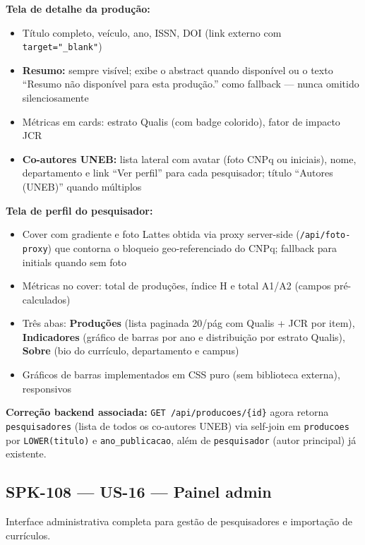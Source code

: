\documentclass[12pt,a4paper]{article}
\begin{document}
\textbf{Tela de detalhe da produção:}
\begin{itemize}[noitemsep]
  \item Título completo, veículo, ano, ISSN, DOI (link externo com \texttt{target="\_blank"})
  \item \textbf{Resumo:} sempre visível; exibe o abstract quando disponível ou o texto
        ``Resumo não disponível para esta produção.'' como fallback — nunca omitido silenciosamente
  \item Métricas em cards: estrato Qualis (com badge colorido), fator de impacto JCR
  \item \textbf{Co-autores UNEB:} lista lateral com avatar (foto CNPq ou iniciais), nome, departamento
        e link ``Ver perfil'' para cada pesquisador; título ``Autores (UNEB)'' quando múltiplos
\end{itemize}

\textbf{Tela de perfil do pesquisador:}
\begin{itemize}[noitemsep]
  \item Cover com gradiente e foto Lattes obtida via proxy server-side (\texttt{/api/foto-proxy})
        que contorna o bloqueio geo-referenciado do CNPq; fallback para initials quando sem foto
  \item Métricas no cover: total de produções, índice H e total A1/A2 (campos pré-calculados)
  \item Três abas: \textbf{Produções} (lista paginada 20/pág com Qualis + JCR por item),
        \textbf{Indicadores} (gráfico de barras por ano e distribuição por estrato Qualis),
        \textbf{Sobre} (bio do currículo, departamento e campus)
  \item Gráficos de barras implementados em CSS puro (sem biblioteca externa), responsivos
\end{itemize}

\textbf{Correção backend associada:} \texttt{GET /api/producoes/\{id\}} agora retorna
\texttt{pesquisadores} (lista de todos os co-autores UNEB) via self-join em
\texttt{producoes} por \texttt{LOWER(titulo)} e \texttt{ano\_publicacao}, além de
\texttt{pesquisador} (autor principal) já existente.

\subsection{SPK-108 — US-16 — Painel admin}

Interface administrativa completa para gestão de pesquisadores e importação de currículos.
\end{document}

